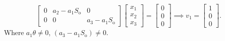 \documentclass[
    8pt,
    aspectratio=1610,
    c,
    intlimits,
		handout,
    leqno,
    professionalfonts,
]{beamer}
\begin{document}
\begin{frame}
\begin{equation*}
\begin{bmatrix}
			0 & a_{2}-a_{1}S_{\text{o}} & 0                       \\
			0 & 0                       & a_{3}-a_{1}S_{\text{o}}
		\end{bmatrix}
		\begin{bmatrix}
			x_{1} \\
			x_{2} \\
			x_{3}
		\end{bmatrix}=
		\begin{bmatrix}
			0 \\
			0 \\
			0
		\end{bmatrix}\implies
		v_{1}=
		\begin{bmatrix}
			1 \\
			0 \\
			0
		\end{bmatrix}.
	\end{equation*}
	Where $a_{1}\theta\neq 0$, $\left(a_{3}-a_{1}S_{\text{o}}\right)\neq 0$.
\end{frame}
\end{document}
